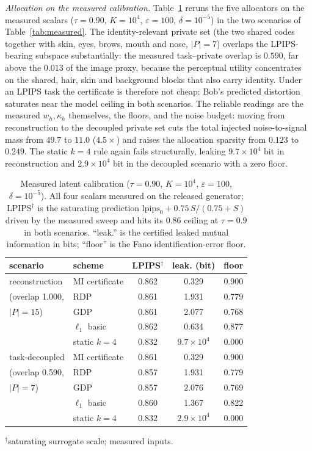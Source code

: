 \documentclass[10pt,twocolumn,letterpaper]{article}
\theoremstyle{plain}
\theoremstyle{definition}
\begin{document}
\emph{Allocation on the measured calibration.}
Table~\ref{tab:latent_alloc} reruns the five allocators on the measured
scalars ($\tau{=}0.90$, $K{=}10^{4}$, $\varepsilon{=}100$,
$\delta{=}10^{-5}$) in the two scenarios of Table~\ref{tab:measured}. The
identity-relevant private set (the two shared codes together with skin,
eyes, brows, mouth and nose, $|P|{=}7$) overlaps the LPIPS-bearing subspace
substantially: the measured task--private overlap is $0.590$, far above the
$0.013$ of the image proxy, because the perceptual utility concentrates on
the shared, hair, skin and background blocks that also carry identity. Under
an LPIPS task the certificate is therefore not cheap: Bob's predicted
distortion saturates near the model ceiling in both scenarios. The reliable
readings are the measured $w_h,\kappa_h$ themselves, the floors, and the
noise budget: moving from reconstruction to the decoupled private set cuts
the total injected noise-to-signal mass from $49.7$ to $11.0$ ($4.5\times$)
and raises the allocation sparsity from $0.123$ to $0.249$. The static
$k{=}4$ rule again fails structurally, leaking $9.7\times10^{4}$ bit in
reconstruction and $2.9\times10^{4}$ bit in the decoupled scenario with a zero
floor.

\begin{table}[t]
\centering\footnotesize
\setlength{\tabcolsep}{3.5pt}
\caption{Measured latent calibration ($\tau{=}0.90$, $K{=}10^{4}$,
$\varepsilon{=}100$, $\delta{=}10^{-5}$). All four scalars measured on the
released generator; LPIPS$^\dagger$ is the saturating prediction
$\mathrm{lpips}_0+0.75\,S/(0.75+S)$ driven by the measured sweep and hits its
$0.86$ ceiling at $\tau{=}0.9$ in both scenarios. ``leak.'' is the certified
leaked mutual information in bits; ``floor'' is the Fano identification-error
floor.}
\label{tab:latent_alloc}
\begin{tabular}{llccc}
\toprule
scenario & scheme & LPIPS$^\dagger$ & leak. (bit) & floor \\
\midrule
reconstruction & MI certificate & 0.862 & 0.329 & 0.900 \\
(overlap 1.000, & RDP            & 0.861 & 1.931 & 0.779 \\
$|P|{=}15$)    & GDP            & 0.861 & 2.077 & 0.768 \\
               & $\ell_1$ basic & 0.862 & 0.634 & 0.877 \\
               & static $k{=}4$ & 0.832 & $9.7\times10^{4}$ & 0.000 \\
\midrule
task-decoupled & MI certificate & 0.861 & 0.329 & 0.900 \\
(overlap 0.590, & RDP           & 0.857 & 1.931 & 0.779 \\
$|P|{=}7$)     & GDP            & 0.857 & 2.076 & 0.769 \\
               & $\ell_1$ basic & 0.860 & 1.367 & 0.822 \\
               & static $k{=}4$ & 0.832 & $2.9\times10^{4}$ & 0.000 \\
\bottomrule
\end{tabular}
$^\dagger$saturating surrogate scale; measured inputs.
\end{table}
\end{document}
